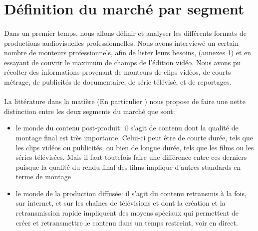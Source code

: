 \section{Définition du marché par segment}

\paragraph{}

Dans un premier temps, nous allons définir et analyser les différents
formats de productions audiovisuelles professionnelles. Nous avons
interviewé un certain nombre de monteurs professionnels, afin de lister
leurs besoins, (annexes 1) et en essayant de couvrir le maximum de champs
de l'édition vidéo. Nous avons pu récolter des informations provenant
de monteurs de clips vidéos, de courts métrage, de publicités de
documentaire, de série télévisé, et de reportages.

\paragraph{}

La littérature dans la matière (En particulier
\cite{WorldVideoNonlinearEditingMarket}) nous propose de faire une nette
distinction entre  les deux segments du marché que sont:

\begin{itemize} \setlength{\itemsep}{2mm}

  \item {le monde du contenu post-produit: il s'agit de contenu dont la
    qualité de montage final est très importante. Celui-ci peut être de
    courte durée, tels que les clips vidéos ou publicités, ou bien de
    longue durée, tels que les films ou les séries télévisées. Mais
    il faut toutefois faire une différence entre ces derniers puisque
    la qualité du rendu final des films implique d'autres standards en
    terme de montage}

  \item {le monde de la production diffusée: il s'agit du contenu
    retransmis à la fois, sur internet, et sur les chaînes de
    télévisions et dont la création et la retransmission rapide
    impliquent des moyens spéciaux qui permettent de créer et
    retransmettre le contenu dans un temps restreint, voir en direct.}

\end{itemize}

\paragraph{}

